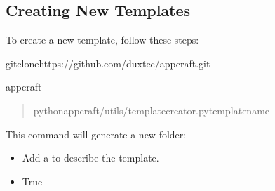 \documentclass[letterpaper,10pt,english]{sphinxhowto}
\begin{document}
\subsection{Creating New Templates}
\label{\detokenize{contributing/index:id2}}
\sphinxAtStartPar
To create a new template, follow these steps:
\begin{description}
\begin{sphinxVerbatim}[commandchars=\\\{\}]
gitclonehttps://github.com/duxtec/appcraft.git
\end{sphinxVerbatim}

\begin{sphinxVerbatim}[commandchars=\\\{\}]
appcraft
\end{sphinxVerbatim}

\begin{quote}

\begin{sphinxVerbatim}[commandchars=\\\{\}]
pythonappcraft/utils/template\PYGZus{}creator.py\PYGZlt{}template\PYGZus{}name\PYGZgt{}
\end{sphinxVerbatim}
\end{quote}

\sphinxAtStartPar
This command will generate a new folder:

\begin{itemize}
\item {} 
\sphinxAtStartPar
Add a  to describe the template.

\item {} \begin{description}
\begin{sphinxVerbatim}[commandchars=\\\{\}]
True
\end{sphinxVerbatim}

\end{description}


\end{itemize}
\end{description}
\end{document}
